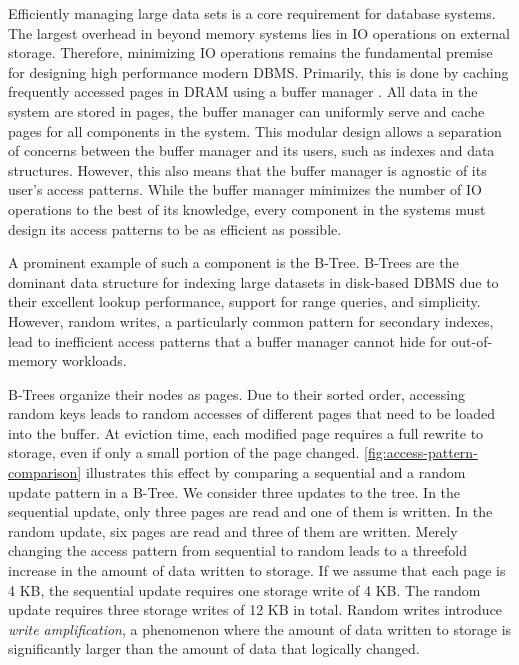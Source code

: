 Efficiently managing large data sets is a core requirement for database systems. 
The largest overhead in beyond memory systems lies in \ac{IO} operations on external storage. 
Therefore, minimizing \ac{IO} operations remains the fundamental premise for designing high performance modern \ac{DBMS}.
Primarily, this is done by caching frequently accessed pages in \ac{DRAM} using a buffer manager \cite{leis2018leanstore}.
All data in the system are stored in pages, the buffer manager can uniformly serve and cache pages for all components in the system.
This modular design allows a separation of concerns between the buffer manager and its users, such as indexes and data structures.
However, this also means that the buffer manager is agnostic of its user's access patterns.
While the buffer manager minimizes the number of \ac{IO} operations to the best of its knowledge, every component in the systems must design its access patterns to be as efficient as possible. 


A prominent example of such a component is the B-Tree. 
B-Trees are the dominant data structure for indexing large datasets in disk-based \ac{DBMS} due to their excellent lookup performance, support for range queries, and simplicity.
However, random writes, a particularly common pattern for secondary indexes, lead to inefficient access patterns that a buffer manager cannot hide for out-of-memory workloads.

B-Trees organize their nodes as pages. Due to their sorted order, accessing random keys leads to random accesses of different pages that need to be loaded into the buffer.
At eviction time, each modified page requires a full rewrite to storage, even if only a small portion of the page changed.
\autoref{fig:access-pattern-comparison} illustrates this effect by comparing a sequential and a random update pattern in a B-Tree.
We consider three updates to the tree.
In the sequential update, only three pages are read and one of them is written.
In the random update, six pages are read and three of them are written.
Merely changing the access pattern from sequential to random leads to a threefold increase in the amount of data written to storage.
If we assume that each page is 4 KB, the sequential update requires one storage write of 4 KB.
The random update requires three storage writes of 12 KB in total.
Random writes introduce \emph{write amplification}, a phenomenon where the amount of data written to storage is significantly larger than the amount of data that logically changed.

